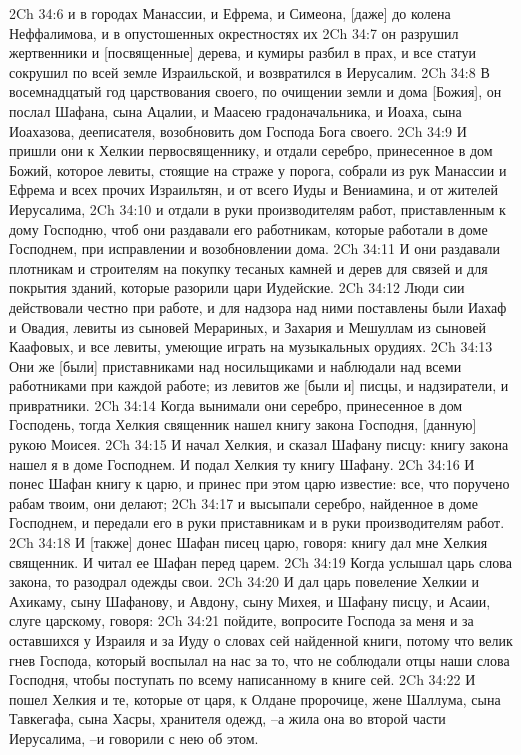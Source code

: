 2Ch 34:6  и в городах Манассии, и Ефрема, и Симеона, [даже] до колена Неффалимова, и в опустошенных окрестностях их
2Ch 34:7  он разрушил жертвенники и [посвященные] дерева, и кумиры разбил в прах, и все статуи сокрушил по всей земле Израильской, и возвратился в Иерусалим.
2Ch 34:8  В восемнадцатый год царствования своего, по очищении земли и дома [Божия], он послал Шафана, сына Ацалии, и Маасею градоначальника, и Иоаха, сына Иоахазова, дееписателя, возобновить дом Господа Бога своего.
2Ch 34:9  И пришли они к Хелкии первосвященнику, и отдали серебро, принесенное в дом Божий, которое левиты, стоящие на страже у порога, собрали из рук Манассии и Ефрема и всех прочих Израильтян, и от всего Иуды и Вениамина, и от жителей Иерусалима,
2Ch 34:10  и отдали в руки производителям работ, приставленным к дому Господню, чтоб они раздавали его работникам, которые работали в доме Господнем, при исправлении и возобновлении дома.
2Ch 34:11  И они раздавали плотникам и строителям на покупку тесаных камней и дерев для связей и для покрытия зданий, которые разорили цари Иудейские.
2Ch 34:12  Люди сии действовали честно при работе, и для надзора над ними поставлены были Иахаф и Овадия, левиты из сыновей Мерариных, и Захария и Мешуллам из сыновей Каафовых, и все левиты, умеющие играть на музыкальных орудиях.
2Ch 34:13  Они же [были] приставниками над носильщиками и наблюдали над всеми работниками при каждой работе; из левитов же [были и] писцы, и надзиратели, и привратники.
2Ch 34:14  Когда вынимали они серебро, принесенное в дом Господень, тогда Хелкия священник нашел книгу закона Господня, [данную] рукою Моисея.
2Ch 34:15  И начал Хелкия, и сказал Шафану писцу: книгу закона нашел я в доме Господнем. И подал Хелкия ту книгу Шафану.
2Ch 34:16  И понес Шафан книгу к царю, и принес при этом царю известие: все, что поручено рабам твоим, они делают;
2Ch 34:17  и высыпали серебро, найденное в доме Господнем, и передали его в руки приставникам и в руки производителям работ.
2Ch 34:18  И [также] донес Шафан писец царю, говоря: книгу дал мне Хелкия священник. И читал ее Шафан перед царем.
2Ch 34:19  Когда услышал царь слова закона, то разодрал одежды свои.
2Ch 34:20  И дал царь повеление Хелкии и Ахикаму, сыну Шафанову, и Авдону, сыну Михея, и Шафану писцу, и Асаии, слуге царскому, говоря:
2Ch 34:21  пойдите, вопросите Господа за меня и за оставшихся у Израиля и за Иуду о словах сей найденной книги, потому что велик гнев Господа, который воспылал на нас за то, что не соблюдали отцы наши слова Господня, чтобы поступать по всему написанному в книге сей.
2Ch 34:22  И пошел Хелкия и те, которые от царя, к Олдане пророчице, жене Шаллума, сына Тавкегафа, сына Хасры, хранителя одежд, --а жила она во второй части Иерусалима, --и говорили с нею об этом.
